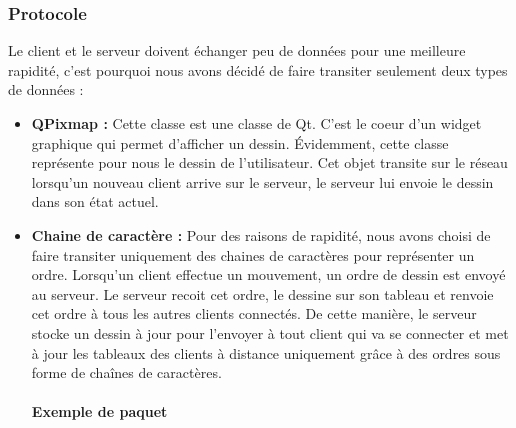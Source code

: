 \documentclass{report}
\begin{document}
			\subsubsection{Protocole}
				Le client et le serveur doivent échanger peu de données pour une meilleure rapidité, c'est pourquoi nous avons décidé de faire transiter seulement deux types de données : 
				\begin{itemize}
					\item \textbf{QPixmap : } Cette classe est une classe de Qt. C'est le coeur d'un widget graphique qui permet d'afficher un dessin. Évidemment, cette classe représente pour nous le dessin de l'utilisateur. Cet objet transite sur le réseau lorsqu'un nouveau client arrive sur le serveur, le serveur lui envoie le dessin dans son état actuel.
					\item \textbf{Chaine de caractère : } Pour des raisons de rapidité, nous avons choisi de faire transiter uniquement des chaines de caractères pour représenter un ordre. Lorsqu'un client effectue un mouvement, un ordre de dessin est envoyé au serveur. Le serveur recoit cet ordre, le dessine sur son tableau et renvoie cet ordre à tous les autres clients connectés. De cette manière, le serveur stocke un dessin à jour pour l'envoyer à tout client qui va se connecter et met à jour les tableaux des clients à distance uniquement grâce à des ordres sous forme de chaînes de caractères.
					
				\paragraph{Exemple de paquet}
				

\end{itemize}
\end{document}
